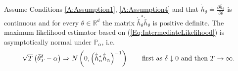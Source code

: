 \documentclass{article}
\begin{document}
\begin{theorem}\label{T:CLTReducedLikelihood}
Assume Conditions \ref{A:Assumption1}, \ref{A:Assumption4} and that $\dot{\bar{h}}_{\theta}\doteq \frac{\partial \bar{h}_{\theta}}{\partial \theta}$ is continuous and for every $\theta\in\mathbb{R}^{d}$ the matrix $\dot{\bar{h}}_{\theta}^{*}\dot{\bar{h}}_{\theta}$ is positive definite. The maximum likelihood estimator based on (\ref{Eq:IntermediateLikelihood}) is asymptotically normal
under $\mathbb{P}_{\alpha}$, i.e.
\begin{equation}
\label{E:CLTReducedLikelihood}
\sqrt{T}\left(\bar{\theta}^{\delta}_{T}-\alpha\right)\Rightarrow N\left(0,\left(\dot{\bar{h}}^{*}_{\alpha}\dot{\bar{h}}_{\alpha}\right)^{-1}\right)\qquad\hbox{first as $\delta\downarrow 0$ and then $T\rightarrow\infty$.}
\end{equation}
\end{theorem}
\end{document}
